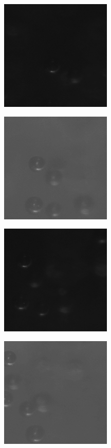			\begin{figure}
				\begin{subfigure}[b]{.55\textwidth}
					\centering
					\includegraphics[scale=.7]{images/rad_calib_1.png}
					\caption{}
				\end{subfigure}
				\begin{subfigure}[b]{.55\textwidth}
					\centering
					\includegraphics[scale=.7]{images/rad_calib_2.jpg}
					\caption{}
				\end{subfigure}
				\begin{subfigure}[b]{.55\textwidth}
					\centering
					\includegraphics[scale=.7]{images/rad_calib_3.png}
					\caption{}
				\end{subfigure}
				\begin{subfigure}[b]{.55\textwidth}
					\centering
					\includegraphics[scale=.7]{images/rad_calib_4.jpg}
					\caption{}
				\end{subfigure}
				

\end{figure}
